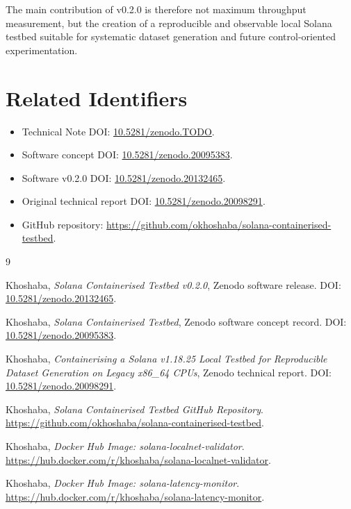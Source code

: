 \documentclass[11pt,a4paper]{article}
\newcommand{\TechnicalNoteDOI}{10.5281/zenodo.TODO}
\newcommand{\SoftwareConceptDOI}{10.5281/zenodo.20095383}
\newcommand{\SoftwareVersionDOI}{10.5281/zenodo.20132465}
\newcommand{\OriginalReportDOI}{10.5281/zenodo.20098291}
\begin{document}
The main contribution of v0.2.0 is therefore not maximum throughput measurement, but the creation of a reproducible and observable local Solana testbed suitable for systematic dataset generation and future control-oriented experimentation.

\section*{Related Identifiers}

\begin{itemize}[leftmargin=2em]
  \item Technical Note DOI: \href{https://doi.org/\TechnicalNoteDOI}{\TechnicalNoteDOI}.
  \item Software concept DOI: \href{https://doi.org/\SoftwareConceptDOI}{\SoftwareConceptDOI}.
  \item Software v0.2.0 DOI: \href{https://doi.org/\SoftwareVersionDOI}{\SoftwareVersionDOI}.
  \item Original technical report DOI: \href{https://doi.org/\OriginalReportDOI}{\OriginalReportDOI}.
  \item GitHub repository: \url{https://github.com/okhoshaba/solana-containerised-testbed}.
\end{itemize}

\begin{thebibliography}{9}

Khoshaba, \emph{Solana Containerised Testbed v0.2.0}, Zenodo software release.
DOI: \href{https://doi.org/\SoftwareVersionDOI}{\SoftwareVersionDOI}.

Khoshaba, \emph{Solana Containerised Testbed}, Zenodo software concept record.
DOI: \href{https://doi.org/\SoftwareConceptDOI}{\SoftwareConceptDOI}.

Khoshaba, \emph{Containerising a Solana v1.18.25 Local Testbed for Reproducible Dataset Generation on Legacy x86\_64 CPUs}, Zenodo technical report.
DOI: \href{https://doi.org/\OriginalReportDOI}{\OriginalReportDOI}.

Khoshaba, \emph{Solana Containerised Testbed GitHub Repository}.
\url{https://github.com/okhoshaba/solana-containerised-testbed}.

Khoshaba, \emph{Docker Hub Image: solana-localnet-validator}.
\url{https://hub.docker.com/r/khoshaba/solana-localnet-validator}.

Khoshaba, \emph{Docker Hub Image: solana-latency-monitor}.
\url{https://hub.docker.com/r/khoshaba/solana-latency-monitor}.

\end{thebibliography}
\end{document}
